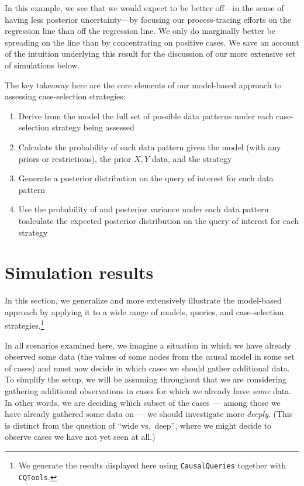 \documentclass[
  12pt,
]{book}
\providecommand{\tightlist}{%
  \setlength{\itemsep}{0pt}\setlength{\parskip}{0pt}}
\begin{document}
In this example, we see that we would expect to be better off---in the sense of having less posterior uncertainty---by focusing our process-tracing efforts on the regression line than off the regression line. We only do marginally better be spreading on the line than by concentrating on positive cases. We save an account of the intuition underlying this result for the discussion of our more extensive set of simulations below.

The key takeaway here are the core elements of our model-based approach to assessing case-selection strategies:

\begin{enumerate}
\def\labelenumi{\arabic{enumi}.}
\tightlist
\item
  Derive from the model the full set of possible data patterns under each case-selection strategy being assessed
\item
  Calculate the probability of each data pattern given the model (with any priors or restrictions), the prior \(X,Y\) data, and the strategy
\item
  Generate a posterior distribution on the query of interest for each data pattern
\item
  Use the probability of and posterior variance under each data pattern toalculate the expected posterior distribution on the query of interest for each strategy
\end{enumerate}

\hypertarget{simulation-results}{%
\section{Simulation results}\label{simulation-results}}

In this section, we generalize and more extensively illustrate the model-based approach by applying it to a wide range of models, queries, and case-selection strategies.\footnote{We generate the results displayed here using \texttt{CausalQueries} together with \texttt{CQTools}.}

In all scenarios examined here, we imagine a situation in which we have already observed some data (the values of some nodes from the causal model in some set of cases) and must now decide in which cases we should gather additional data. To simplify the setup, we will be assuming throughout that we are considering gathering additional observations in cases for which we already have \emph{some} data. In other words, we are deciding which subset of the cases --- among those we have already gathered some data on --- we should investigate more \emph{deeply}. (This is distinct from the question of ``wide vs.~deep'', where we might decide to observe cases we have not yet seen at all.)
\end{document}
